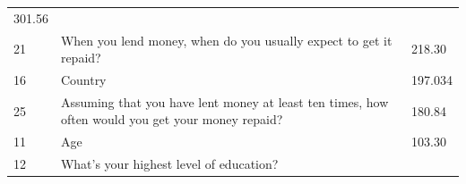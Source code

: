 \begin{longtable}[]{@{}lll@{}}
\begin{minipage}[t]{0.09\columnwidth}
301.56\strut
\end{minipage}\tabularnewline
\begin{minipage}[t]{0.05\columnwidth}\raggedright
21\strut
\end{minipage} & \begin{minipage}[t]{0.77\columnwidth}\raggedright
When you lend money, when do you usually expect to get it repaid?\strut
\end{minipage} & \begin{minipage}[t]{0.09\columnwidth}\raggedright
218.30\strut
\end{minipage}\tabularnewline
\begin{minipage}[t]{0.05\columnwidth}\raggedright
16\strut
\end{minipage} & \begin{minipage}[t]{0.77\columnwidth}\raggedright
Country\strut
\end{minipage} & \begin{minipage}[t]{0.09\columnwidth}\raggedright
197.034\strut
\end{minipage}\tabularnewline
\begin{minipage}[t]{0.05\columnwidth}\raggedright
25\strut
\end{minipage} & \begin{minipage}[t]{0.77\columnwidth}\raggedright
Assuming that you have lent money at least ten times, how often would
you get your money repaid?\strut
\end{minipage} & \begin{minipage}[t]{0.09\columnwidth}\raggedright
180.84\strut
\end{minipage}\tabularnewline
\begin{minipage}[t]{0.05\columnwidth}\raggedright
11\strut
\end{minipage} & \begin{minipage}[t]{0.77\columnwidth}\raggedright
Age\strut
\end{minipage} & \begin{minipage}[t]{0.09\columnwidth}\raggedright
103.30\strut
\end{minipage}\tabularnewline
\begin{minipage}[t]{0.05\columnwidth}\raggedright
12\strut
\end{minipage} & \begin{minipage}[t]{0.77\columnwidth}\raggedright
What's your highest level of education?\strut
\end{minipage} & \begin{minipage}[t]{0.09\columnwidth}\raggedright

\end{minipage}
\end{longtable}
